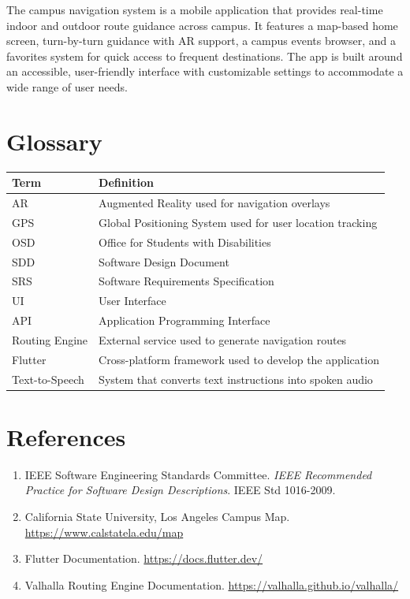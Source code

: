 \documentclass[12pt]{article}
\begin{document}
The campus navigation system is a mobile application that provides real-time indoor and outdoor route guidance across campus. It features a map-based home screen, turn-by-turn guidance with AR support, a campus events browser, and a favorites system for quick access to frequent destinations. The app is built around an accessible, user-friendly interface with customizable settings to accommodate a wide range of user needs.

\section{Glossary}

\begin{tabularx}{\textwidth}{|l|X|}
\hline
\textbf{Term} & \textbf{Definition} \\
\hline
AR & Augmented Reality used for navigation overlays \\
\hline
GPS & Global Positioning System used for user location tracking \\
\hline
OSD & Office for Students with Disabilities \\
\hline
SDD & Software Design Document \\
\hline
SRS & Software Requirements Specification \\
\hline
UI & User Interface \\
\hline
API & Application Programming Interface \\
\hline
Routing Engine & External service used to generate navigation routes \\
\hline
Flutter & Cross-platform framework used to develop the application \\
\hline
Text-to-Speech & System that converts text instructions into spoken audio \\
\hline
\end{tabularx}

\section{References}

\begin{enumerate}
    \item IEEE Software Engineering Standards Committee. \textit{IEEE Recommended Practice for Software Design Descriptions}. IEEE Std 1016-2009.
    \item California State University, Los Angeles Campus Map. \url{https://www.calstatela.edu/map}
    \item Flutter Documentation. \url{https://docs.flutter.dev/}
    \item Valhalla Routing Engine Documentation. \url{https://valhalla.github.io/valhalla/}
\end{enumerate}
\end{document}
